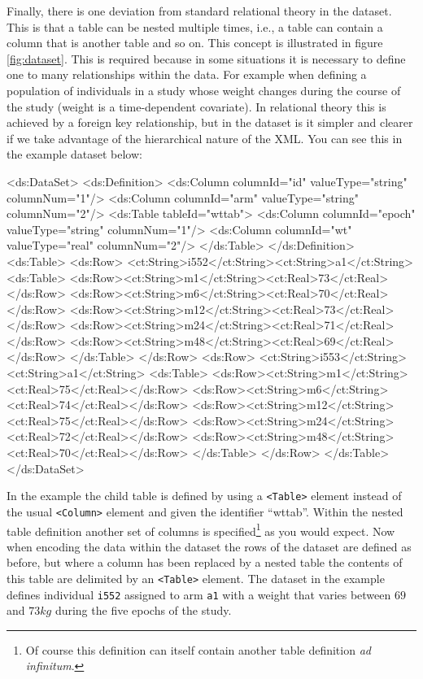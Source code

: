 \documentclass[a4paper,10pt]{article}
\newcommand{\xelem}[1]{\texttt{<#1>}\index{XML Element!\texttt{<#1>}}}
\begin{document}
 Finally, there is one deviation from standard relational theory in the
dataset. This is that a table can be nested multiple times, i.e., a
table can contain a column that is another table and so on. This
concept is illustrated in figure \ref{fig:dataset}. This is required
because in some situations it is necessary to define one to many
relationships within the data. For example when defining a population
of individuals in a study whose weight changes during the course of
the study (weight is a time-dependent covariate). In relational theory
this is achieved by a foreign key relationship, but in the dataset is
it simpler and clearer if we take advantage of the hierarchical nature
of the XML. You can see this in the example dataset below:
%
\begin{xmlcode}
<ds:DataSet>
    <ds:Definition>
        <ds:Column columnId="id" valueType="string" columnNum="1"/>
        <ds:Column columnId="arm" valueType="string" columnNum="2"/>
        <ds:Table tableId="wttab">
            <ds:Column columnId="epoch" valueType="string" columnNum="1"/>
            <ds:Column columnId="wt" valueType="real" columnNum="2"/>
        </ds:Table>
    </ds:Definition>
    <ds:Table>
        <ds:Row>
            <ct:String>i552</ct:String><ct:String>a1</ct:String>
                <ds:Table>
                    <ds:Row><ct:String>m1</ct:String><ct:Real>73</ct:Real></ds:Row>
                    <ds:Row><ct:String>m6</ct:String><ct:Real>70</ct:Real></ds:Row>
                    <ds:Row><ct:String>m12</ct:String><ct:Real>73</ct:Real></ds:Row>
                    <ds:Row><ct:String>m24</ct:String><ct:Real>71</ct:Real></ds:Row>
                    <ds:Row><ct:String>m48</ct:String><ct:Real>69</ct:Real></ds:Row>
                </ds:Table>
        </ds:Row>
        <ds:Row>
            <ct:String>i553</ct:String><ct:String>a1</ct:String>
            <ds:Table>
                <ds:Row><ct:String>m1</ct:String><ct:Real>75</ct:Real></ds:Row>
                <ds:Row><ct:String>m6</ct:String><ct:Real>74</ct:Real></ds:Row>
                <ds:Row><ct:String>m12</ct:String><ct:Real>75</ct:Real></ds:Row>
                <ds:Row><ct:String>m24</ct:String><ct:Real>72</ct:Real></ds:Row>
                <ds:Row><ct:String>m48</ct:String><ct:Real>70</ct:Real></ds:Row>
            </ds:Table>
        </ds:Row>
    </ds:Table>
</ds:DataSet>
\end{xmlcode}
%
In the example the child table is defined by using a \xelem{Table}
element instead of the usual \xelem{Column} element and given the identifier
``wttab''. Within the nested table definition another set of
columns is specified\footnote{Of course this definition can itself
  contain another table definition \emph{ad infinitum}.} as you would
expect. Now when encoding the data within the dataset the rows of the
dataset are defined as before, but where a column has been replaced by
a nested table the contents of this table are delimited by an
\xelem{Table} element. The dataset in the example defines
individual \texttt{i552} assigned to arm \texttt{a1} with a weight
that varies between $69$ and $73 kg$ during the five epochs of the
study.
\end{document}
